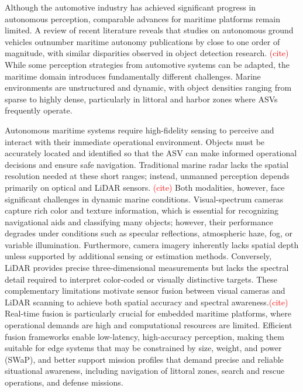 \documentclass{erauthesis}
\begin{document}
Although the automotive industry has achieved significant progress in autonomous perception, comparable advances for maritime platforms remain limited. 
A review of recent literature reveals that studies on autonomous ground vehicles outnumber maritime autonomy publications by close to one order of magnitude, with similar disparities observed in object detection research. \textcolor{red}{(cite)}
While some perception strategies from automotive systems can be adapted, the maritime domain introduces fundamentally different challenges. 
Marine environments are unstructured and dynamic, with object densities ranging from sparse to highly dense, particularly in littoral and harbor zones where \acp{ASV} frequently operate.

Autonomous maritime systems require high-fidelity sensing to perceive and interact with their immediate operational environment.
Objects must be accurately located and identified so that the \ac{ASV} can make informed operational decisions and ensure safe navigation.
Traditional marine radar lacks the spatial resolution needed at these short ranges; instead, unmanned perception depends primarily on optical and \ac{LiDAR} sensors. \textcolor{red}{(cite)}
Both modalities, however, face significant challenges in dynamic marine conditions.
Visual-spectrum cameras capture rich color and texture information, which is essential for recognizing navigational aids and classifying many objects; however, their performance degrades under conditions such as specular reflections, atmospheric haze, fog, or variable illumination.
Furthermore, camera imagery inherently lacks spatial depth unless supported by additional sensing or estimation methods.
Conversely, \ac{LiDAR} provides precise three-dimensional measurements but lacks the spectral detail required to interpret color-coded or visually distinctive targets.
These complementary limitations motivate sensor fusion between visual cameras and \ac{LiDAR} scanning to achieve both spatial accuracy and spectral awareness.\textcolor{red}{(cite)}
Real-time fusion is particularly crucial for embedded maritime platforms, where operational demands are high and computational resources are limited.
Efficient fusion frameworks enable low-latency, high-accuracy perception, making them suitable for edge systems that may be constrained by size, weight, and power (SWaP), and better support mission profiles that demand precise and reliable situational awareness, including navigation of littoral zones, search and rescue operations, and defense missions.
\end{document}
